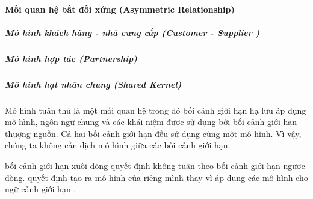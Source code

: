 \documentclass{article} %
\begin{document}
% 
%
%
%
%

\paragraph{Mối quan hệ bất đối xứng (Asymmetric Relationship)}





\subparagraph{Mô hình khách hàng - nhà cung cấp (Customer - Supplier  )}












 




\subparagraph{Mô hình hợp tác (Partnership)}

% 

\subparagraph{Mô hình hạt nhân chung (Shared Kernel)}

% 
%



Mô hình tuân thủ là một mối quan hệ trong đó bối cảnh giới hạn hạ lưu áp dụng mô hình, ngôn ngữ chung và các khái niệm được sử dụng bởi bối cảnh giới hạn thượng nguồn.
Cả hai bối cảnh giới hạn đều sử dụng cùng một mô hình. Vì vậy, chúng ta không cần dịch mô hình giữa các bối cảnh giới hạn.


bối cảnh giới hạn xuôi dòng quyết định không tuân theo bối cảnh giới hạn ngược dòng.
quyết định tạo ra mô hình của riêng mình thay vì áp dụng các mô hình cho ngữ cảnh giới hạn .


\end{document}
